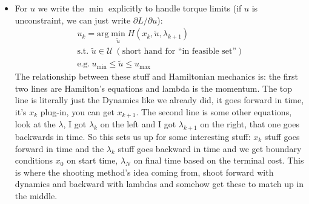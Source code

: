 \begin{itemize}
\begin{equation}
\begin{aligned}
            \frac{\partial L}{\partial x_N}=\frac{\partial l_F}{\partial x_N}-\lambda _{N}^{T}
        \end{aligned}
    \end{equation}
    \item For $u$ we write the $\min$ explicitly to handle torque limits (if $u$ is unconstraint, we can just write $\partial L / \partial u$):
    \begin{equation}
        \begin{aligned}
            u_k=\text{arg}\min _{\tilde{u}}H\left( x_k,\tilde{u},\lambda _{k+1} \right)\\
            \text{s.t.\ }\tilde{u}\in \mathcal{U}\ \left( \text{short hand for ``in feasible set''} \right)\\
            \text{e.g.}\  u_{\min}\le \tilde{u}\le u_{\max}
        \end{aligned}
    \end{equation}
    The relationship between these stuff and Hamiltonian mechanics is: the first two lines are Hamilton's equations and lambda is the momentum. The top line is literally just the Dynamics like we already did, it goes forward in time, it's $x_k$ plug-in, you can get $x_{k+1}$. The second line is some other equations, look at the $\lambda$, I got $\lambda_k$ on the left and I got $\lambda_{k+1}$ on the right, that one goes backwards in time. So this sets us up for some interesting stuff: $x_k$ stuff goes forward in time and the $\lambda_k$ stuff goes backward in time and we get boundary conditions $x_0$ on start time, $\lambda_N$ on final time based on the terminal cost. This is where the shooting method's idea coming from, shoot forward with dynamics and backward with lambdas and somehow get these to match up in the middle.


\end{itemize}
